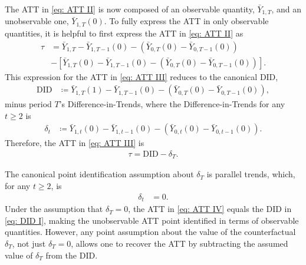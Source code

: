\documentclass[twoside,11pt]{article}
\begin{document}
The \textrm{ATT} in \eqref{eq: ATT II} is now composed of an observable quantity, $\bar{Y}_{1,T}$, and an unobservable one, $\bar{Y}_{1,T}(0)$. To fully express the \textrm{ATT} in only observable quantities, it is helpful to first express the \textrm{ATT} in \eqref{eq: ATT II} as
\small
\begin{equation} \label{eq: ATT III}
\begin{split}
\tau & = \bar{Y}_{1,T} - \bar{Y}_{1,T-1}(0) - \left(\bar{Y}_{0,T}(0) - \bar{Y}_{0,T-1}(0)\right) \\ 
& - \left[\bar{Y}_{1,T}(0) - \bar{Y}_{1,T-1}(0) - \left(\bar{Y}_{0,T}(0) - \bar{Y}_{0,T-1}(0)\right)\right].
\end{split}
\end{equation}
\normalsize
This expression for the \textrm{ATT} in \eqref{eq: ATT III} reduces to the canonical \textrm{DID},
\begin{align} \label{eq: DID I}
\textrm{DID} & \coloneqq \bar{Y}_{1,T}(1) - \bar{Y}_{1,T-1}(0) - \left(\bar{Y}_{0,T}(0) - \bar{Y}_{0,T-1}(0)\right),
\end{align}
minus period $T$'s Difference-in-Trends, where the Difference-in-Trends for any $t \geq 2$ is
\begin{align} \label{eq: diff-in-trends I}
\delta_t & \coloneqq \bar{Y}_{1,t}(0) - \bar{Y}_{1,t-1}(0) - \left(\bar{Y}_{0,t}(0) - \bar{Y}_{0,t-1}(0)\right).
\end{align}
Therefore, the \textrm{ATT} in \eqref{eq: ATT III} is 
\begin{align} \label{eq: ATT IV}
\tau = \textrm{DID} - \delta_T.
\end{align}

The canonical point identification assumption about $\delta_T$ is parallel trends, which, for any $t \geq 2$, is
\begin{align} \label{eq: parallel trends}
\delta_t & = 0.
\end{align}
Under the assumption that $\delta_T = 0$, the ATT in \eqref{eq: ATT IV} equals the DID in \eqref{eq: DID I}, making the unobservable \textrm{ATT} point identified in terms of observable quantities. However, any point assumption about the value of the counterfactual $\delta_T$, not just $\delta_T = 0$, allows one to recover the \textrm{ATT} by subtracting the assumed value of $\delta_T$ from the \textrm{DID}.
\end{document}
